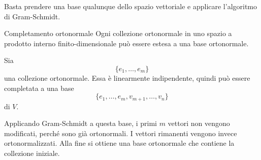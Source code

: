 \documentclass[a4paper]{article}
\begin{document}
\begin{snippetproof}{}
    Basta prendere una base qualunque dello spazio vettoriale e applicare l'algoritmo di Gram-Schmidt.
\end{snippetproof}

\begin{snippetcorollary}{Completamento ortonormale}
    Ogni collezione ortonormale in uno spazio a prodotto interno finito-dimensionale può essere estesa a una base ortonormale.
\end{snippetcorollary}

\begin{snippetproof}{}
    Sia
    \[
        \{e_1,\ldots,e_m\}
    \]
    una collezione ortonormale. Essa è linearmente indipendente, quindi può essere completata a una base
    \[
        \{e_1,\ldots,e_m,v_{m+1},\ldots,v_n\}
    \]
    di \(V\).

    Applicando Gram-Schmidt a questa base, i primi \(m\) vettori non vengono modificati, perché sono già ortonormali. I vettori rimanenti vengono invece ortonormalizzati. Alla fine si ottiene una base ortonormale che contiene la collezione iniziale.
\end{snippetproof}
\end{document}
